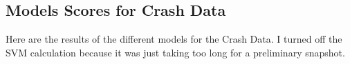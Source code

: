 \documentclass[11pt]{article}
\begin{document}
\begin{spacing}{1.2}
\section{Models Scores for Crash Data}

Here are the results of the different models for the Crash Data.  I turned off the SVM calculation because it was just taking too long for a preliminary snapshot.  

\




\clearpage
{}
\printindex

\end{spacing}
\end{document}
